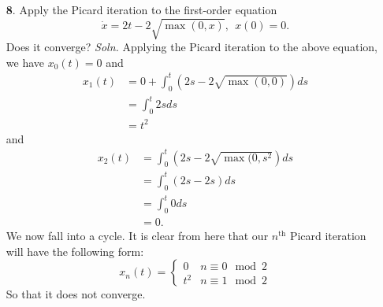 \documentclass{article}
\begin{document}
\begin{itemize}
    \item[\textbf{8}.] Apply the Picard iteration to the first-order equation
    \[\dot{x} = 2t - 2\sqrt{\max(0,x)}, \:\: x(0) = 0.\]
    Does it converge?
    \newline\newline
    \textit{Soln.} Applying the Picard iteration to the above equation, we have $x_0(t) = 0$ and 
    \begin{align*}
        x_1(t) &= 0 + \int_0^t (2s - 2\sqrt{\max(0, 0)})ds\\
        &= \int_0^t 2s ds\\
        &= t^2
    \end{align*}
    and
    \begin{align*}
        x_2(t) &= \int_0^t (2s - 2\sqrt{\max(0, s^2})ds\\
        &= \int_0^t (2s - 2s)ds\\
        &= \int_0^t 0 ds\\
        &= 0.
    \end{align*}
    We now fall into a cycle. It is clear from here that our $n^{\text{th}}$ Picard iteration will have the following form:
    \[x_n(t) = \begin{cases}
        0 & n \equiv 0 \mod 2\\
        t^2 & n \equiv 1 \mod 2
    \end{cases}\]
    So that it does not converge.
    
    
\end{itemize}
\end{document}
